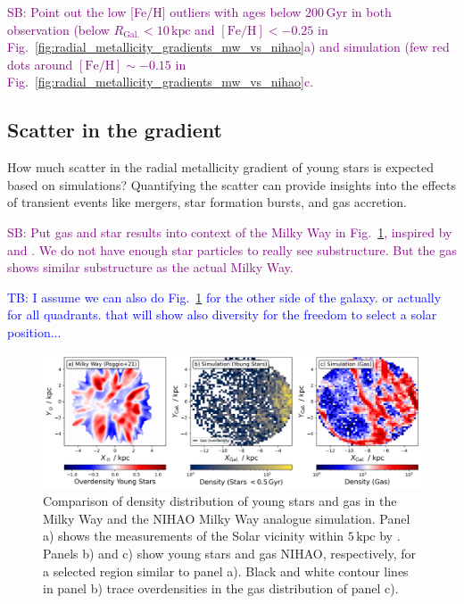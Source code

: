 \documentclass[fleqn,usenatbib]{mnras}
\newcommand{\SB}[1]{{\textcolor{purple}{SB: #1}}}
\newcommand{\TB}[1]{{\textcolor{blue}{TB: #1}}}
\begin{document}
\SB{Point out the low [Fe/H] outliers with ages below $200\,\mathrm{Gyr}$ in both observation (below $R_\mathrm{Gal.} < 10\,\mathrm{kpc}$ and $\mathrm{[Fe/H]} < -0.25$ in Fig.~\ref{fig:radial_metallicity_gradients_mw_vs_nihao}a) and simulation (few red dots around $\mathrm{[Fe/H]} \sim -0.15$ in Fig.~\ref{fig:radial_metallicity_gradients_mw_vs_nihao}c.}



\subsection{Scatter in the gradient} \label{sec:discussion_scatter}

How much scatter in the radial metallicity gradient of young stars is expected based on simulations? Quantifying the scatter can provide insights into the effects of transient events like mergers, star formation bursts, and gas accretion.

\SB{Put gas and star results into context of the Milky Way in Fig.~\ref{fig:overdensities_mw_vs_nihao}, inspired by \citet{Poggio2021} and \citet{Hackshaw2024}. We do not have enough star particles to really see substructure. But the gas shows similar substructure as the actual Milky Way.}

\TB{I assume we can also do Fig.~\ref{fig:overdensities_mw_vs_nihao} for the other side of the galaxy. or actually for all quadrants. that will show also diversity for the freedom to select a solar position...}

\begin{figure}
    \centering
    \includegraphics[width=\textwidth]{figures/overdensities_mw_vs_nihao.png}
    \caption{Comparison of density distribution of young stars and gas in the Milky Way and the NIHAO Milky Way analogue simulation. Panel a) shows the measurements of the Solar vicinity within $5\,\mathrm{kpc}$ by \citet{Poggio2021}. Panels b) and c) show young stars and gas NIHAO, respectively, for a selected region similar to panel a). Black and white contour lines in panel b) trace overdensities in the gas distribution of panel c).}
    \label{fig:overdensities_mw_vs_nihao}
\end{figure}
\end{document}
